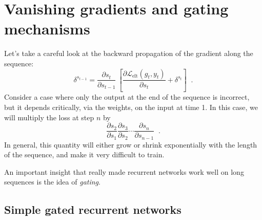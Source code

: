 \section{Vanishing gradients and gating mechanisms}
\label{lstm}
\label{sec-rnn_lstm}

Let's take a careful look at the backward propagation of the gradient
along the sequence:
\begin{equation}
  \delta^{s_{t -1}} = \frac{\partial s_t}{\partial s_{t - 1}} ~
  \left[\frac{\partial \mathcal{L}_\text{elt}(g_t, y_t)}{\partial s_t}
    + \delta^{s_t}\right]\;\;.
\end{equation}
Consider a case where only the output at the end of the sequence is
incorrect, but it depends critically, via the weights,  on the input
at time 1.   In this case, we will multiply the loss at step $n$ by
\begin{equation}
  \frac{\partial s_2}{\partial s_1} \frac{\partial s_3}{\partial
    s_2} \cdots \frac{\partial s_n}{\partial s_{n-1}}\;\;.
\end{equation}
In general, this quantity will either grow or shrink exponentially
with the length of the sequence, and make it very difficult to train.

An important insight that really made recurrent networks work well on
long sequences is the idea of {\em gating}.

\subsection{Simple gated recurrent networks}

